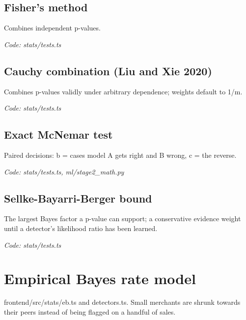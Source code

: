 \documentclass[11pt,a4paper]{article}
\newcommand{\where}[1]{\par{\small\itshape\color{mute}Code: #1}\par}
\begin{document}
\subsection*{Fisher's method}
\par\smallskip\noindent{}\par\smallskip
Combines independent p-values.
\where{stats/tests.ts}

\subsection*{Cauchy combination (Liu and Xie 2020)}
\par\smallskip\noindent{}\par\smallskip
Combines p-values validly under arbitrary dependence; weights default to 1/m.
\where{stats/tests.ts}

\subsection*{Exact McNemar test}
\par\smallskip\noindent{}\par\smallskip
Paired decisions: b = cases model A gets right and B wrong, c = the reverse.
\where{stats/tests.ts, ml/stage2\_math.py}

\subsection*{Sellke-Bayarri-Berger bound}
\par\smallskip\noindent{}\par\smallskip
The largest Bayes factor a p-value can support; a conservative evidence weight until a detector's likelihood ratio has been learned.
\where{stats/tests.ts}

\clearpage
\section{Empirical Bayes rate model}
{\color{mute}frontend/src/stats/eb.ts and detectors.ts. Small merchants are shrunk towards their peers instead of being flagged on a handful of sales.}
\end{document}
